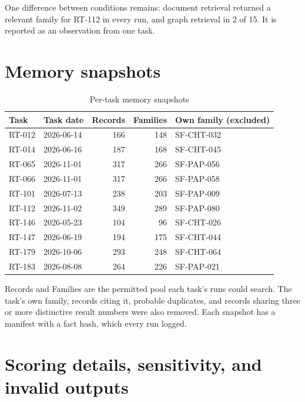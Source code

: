 \documentclass[11pt]{article}
\begin{document}
One difference between conditions remains: document retrieval returned a relevant family for RT-112 in every run, and graph retrieval in 2 of 15. It is reported as an observation from one task.

\FloatBarrier

\section{Memory snapshots}
\label{app:snapshots}

\begin{table}[ht]
\centering
\caption{Per-task memory snapshots}
\label{tab:snapshots}
\small
\begin{tabular}{llrrl}
\toprule
Task & Task date & Records & Families & Own family (excluded) \\
\midrule
RT-012 & 2026-06-14 & 166 & 148 & SF-CHT-032 \\
RT-014 & 2026-06-16 & 187 & 168 & SF-CHT-045 \\
RT-065 & 2026-11-01 & 317 & 266 & SF-PAP-056 \\
RT-066 & 2026-11-01 & 317 & 266 & SF-PAP-058 \\
RT-101 & 2026-07-13 & 238 & 203 & SF-PAP-009 \\
RT-112 & 2026-11-02 & 349 & 289 & SF-PAP-080 \\
RT-146 & 2026-05-23 & 104 & 96 & SF-CHT-026 \\
RT-147 & 2026-06-19 & 194 & 175 & SF-CHT-044 \\
RT-179 & 2026-10-06 & 293 & 248 & SF-CHT-064 \\
RT-183 & 2026-08-08 & 264 & 226 & SF-PAP-021 \\
\bottomrule
\end{tabular}

\vspace{0.4em}
\begin{minipage}{0.92\linewidth}\footnotesize
Records and Families are the permitted pool each task's runs could search. The task's own family, records citing it, probable duplicates, and records sharing three or more distinctive result numbers were also removed. Each snapshot has a manifest with a fact hash, which every run logged.
\end{minipage}
\end{table}


\FloatBarrier

\section{Scoring details, sensitivity, and invalid outputs}
\label{app:scoring}
\end{document}
